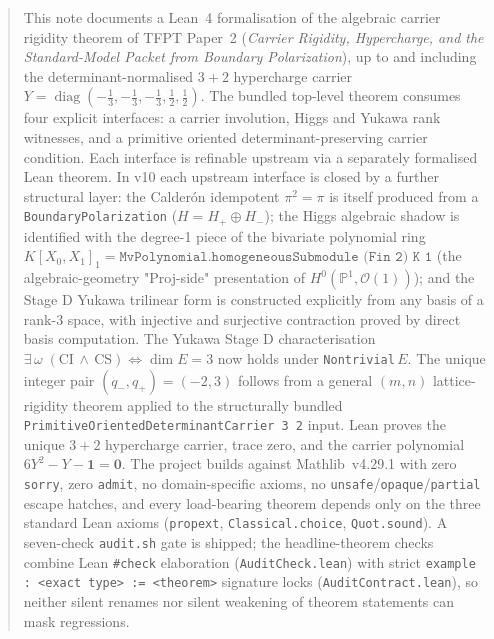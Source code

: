 
\maketitle

\begin{abstract}
This note documents a Lean~4 formalisation of the algebraic
carrier rigidity theorem of TFPT Paper~2 (\emph{Carrier Rigidity,
Hypercharge, and the Standard-Model Packet from Boundary
Polarization}), up to and including the determinant-normalised
$3+2$ hypercharge carrier
$Y = \operatorname{diag}(-\tfrac13,-\tfrac13,-\tfrac13,\tfrac12,\tfrac12)$.
The bundled top-level theorem consumes four explicit interfaces:
a carrier involution, Higgs and Yukawa rank witnesses, and a
primitive oriented determinant-preserving carrier condition.
Each interface is refinable upstream via a separately formalised
Lean theorem. In v10 each upstream interface is closed by a
further structural layer: the Calder\'on idempotent
$\pi^2 = \pi$ is itself produced from a
\texttt{BoundaryPolarization} ($H = H_+ \oplus H_-$); the Higgs
algebraic shadow is identified with the degree-1 piece of the
bivariate polynomial ring
$K[X_0, X_1]_1 = \texttt{MvPolynomial.homogeneousSubmodule (Fin 2) K 1}$
(the algebraic-geometry "Proj-side" presentation of
$H^0(\mathbb P^1, \mathcal O(1))$); and the Stage D Yukawa
trilinear form is constructed explicitly from any basis of a
rank-$3$ space, with injective and surjective contraction proved
by direct basis computation. The Yukawa Stage D characterisation
$\exists\,\omega\;(\textrm{CI}\,\wedge\,\textrm{CS})
  \iff \dim E = 3$ now holds under \texttt{Nontrivial}\,$E$. The unique integer
pair $(q_-,q_+)=(-2,3)$ follows from a general $(m,n)$
lattice-rigidity theorem applied to the structurally bundled
\texttt{PrimitiveOrientedDeterminantCarrier 3 2} input. Lean
proves the unique $3+2$ hypercharge carrier, trace zero, and the
carrier polynomial $6 Y^2 - Y - \mathbf 1 = \mathbf 0$. The
project builds against Mathlib~v4.29.1 with zero \texttt{sorry},
zero \texttt{admit}, no domain-specific axioms, no
\texttt{unsafe}/\texttt{opaque}/\texttt{partial} escape hatches,
and every load-bearing theorem depends only on the three standard
Lean axioms (\texttt{propext}, \texttt{Classical.choice},
\texttt{Quot.sound}). A seven-check \texttt{audit.sh} gate is
shipped; the headline-theorem checks combine Lean
\texttt{\#check} elaboration (\texttt{AuditCheck.lean}) with
strict \texttt{example : <exact type> := <theorem>} signature
locks (\texttt{AuditContract.lean}), so neither silent renames
nor silent weakening of theorem statements can mask regressions.
\end{abstract}

